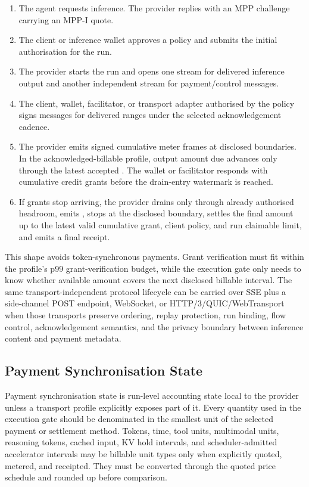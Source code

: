 \documentclass[11pt]{article}
\newcommand{\field}[1]{\texttt{\detokenize{#1}}}
\newcommand{\mppi}{MPP-I}
\begin{document}
\begin{enumerate}
  \item The agent requests inference. The provider replies with an MPP \field{402} challenge carrying an \mppi{} quote.
  \item The client or inference wallet approves a policy and submits the initial authorisation for the run.
  \item The provider starts the run and opens one stream for delivered inference output and another independent stream for payment/control messages.
  \item The client, wallet, facilitator, or transport adapter authorised by the policy signs \field{DeliveryAck} messages for delivered ranges under the selected acknowledgement cadence.
  \item The provider emits signed cumulative meter frames at disclosed boundaries. In the acknowledged-billable profile, output amount due advances only through the latest accepted \field{DeliveryAck}. The wallet or facilitator responds with cumulative credit grants before the drain-entry watermark is reached.
  \item If grants stop arriving, the provider drains only through already authorised headroom, emits \field{draining}, stops at the disclosed boundary, settles the final amount up to the latest valid cumulative grant, client policy, and run claimable limit, and emits a final receipt.
\end{enumerate}

This shape avoids token-synchronous payments. Grant verification must fit within the profile's p99 grant-verification budget, while the execution gate only needs to know whether available amount covers the next disclosed billable interval. The same transport-independent protocol lifecycle can be carried over SSE plus a side-channel POST endpoint, WebSocket, or HTTP/3/QUIC/WebTransport when those transports preserve ordering, replay protection, run binding, flow control, acknowledgement semantics, and the privacy boundary between inference content and payment metadata.

\subsection{Payment Synchronisation State}

Payment synchronisation state is run-level accounting state local to the provider unless a transport profile explicitly exposes part of it. Every quantity used in the execution gate should be denominated in the smallest unit of the selected payment or settlement method. Tokens, time, tool units, multimodal units, reasoning tokens, cached input, KV hold intervals, and scheduler-admitted accelerator intervals may be billable unit types only when explicitly quoted, metered, and receipted. They must be converted through the quoted price schedule and rounded up before comparison.
\end{document}
